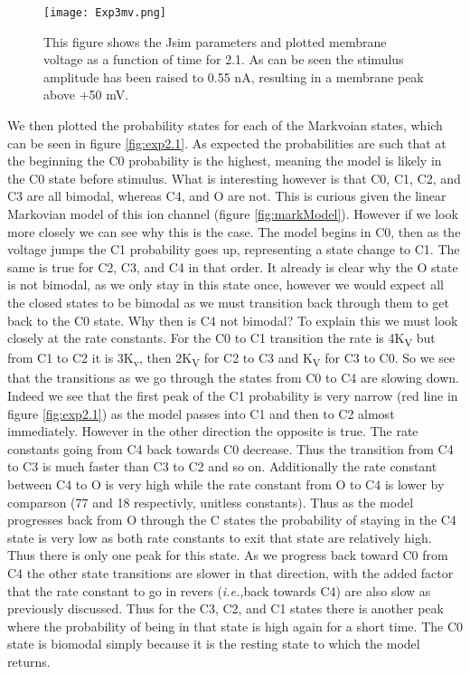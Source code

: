 \documentclass[12pt]{article}
\newcommand{\ie}{{\em i.e.,}}
\begin{document}
\begin{figure}[H]
	\centering
	\centering
	\texttt{[image: Exp3mv.png]}
	
	\caption{ This figure shows the Jsim parameters and plotted membrane voltage as a function of time for 2.1. As can be seen the stimulus amplitude has been raised to 0.55 nA, resulting in a membrane peak above +50 mV.}
	\label{fig:exp2.1mv}
\end{figure}
\par{}
We then plotted the probability states for each of the Markvoian states, which can be seen in figure \ref{fig:exp2.1}. As expected the probabilities are such that at the beginning the C0 probability is the highest, meaning the model is likely in the C0 state before stimulus. What is interesting however is that C0, C1, C2, and C3 are all bimodal, whereas C4, and O are not. This is curious given the linear Markovian model of this ion channel (figure \ref{fig:markModel}). However if we look more closely we can see why this is the case. The model begins in C0, then as the voltage jumps the C1 probability goes up, representing a state change to C1. The same is true for C2, C3, and C4 in that order. It already is clear why the O state is not bimodal, as we only stay in this state once, however we would expect all the closed states to be bimodal as we must transition back through them to get back to the C0 state. Why then is C4 not bimodal? To explain this we must look closely at the rate constants. For the C0 to C1 transition the rate is 4K\textsubscript{V} but from C1 to C2 it is 3K\textsubscript{v}, then 2K\textsubscript{V} for C2 to C3 and K\textsubscript{V} for C3 to C0. So we see that the transitions as we go through the states from C0 to C4 are slowing down. Indeed we see that the first peak of the C1 probability is very narrow (red line in figure \ref{fig:exp2.1}) as the model passes into C1 and then to C2 almost immediately. However in the other direction the opposite is true. The rate constants going from C4 back towards C0 decrease. Thus the transition from C4 to C3 is much faster than C3 to C2 and so on. Additionally the rate constant between C4 to O is very high while the rate constant from O to C4 is lower by comparson (77 and 18 respectivly, unitless constants). Thus as the model progresses back from O through the C states the probability of staying in the C4 state is very low as both rate constants to exit that state are relatively high. Thus there is only one peak for this state. As we progress back toward C0 from C4 the other state transitions are slower in that direction, with the added factor that the rate constant to go in revers (\ie back towards C4) are also slow as previously discussed. Thus for the C3, C2, and C1 states there is another peak where the probability of being in that state is high again for a short time. The C0 state is biomodal simply because it is the resting state to which the model returns.
\end{document}
